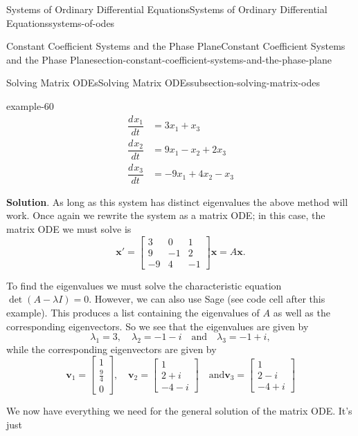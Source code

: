 \documentclass[oneside,10pt,]{book}
\numberwithin{equation}{section}
\renewcommand{\vec}[1]{\mathbf{#1}}
\newcommand{\dv}[3][]{\dfrac{d^{#1} #2}{d #3^{#1}}}
\newcommand{\amp}{&}
\begin{document}
\begin{chapterptx}{Systems of Ordinary Differential Equations}{}{Systems of Ordinary Differential Equations}{}{}{systems-of-odes}
\begin{sectionptx}{Constant Coefficient Systems and the Phase Plane}{}{Constant Coefficient Systems and the Phase Plane}{}{}{section-constant-coefficient-systems-and-the-phase-plane}
\begin{subsectionptx}{Solving Matrix ODEs}{}{Solving Matrix ODEs}{}{}{subsection-solving-matrix-odes}
\begin{example}{}{example-60}
\begin{align*}
\dv{x_{1}}{t} \amp = 3x_{1}+x_{3}\\
\dv{x_{2}}{t} \amp = 9x_{1}-x_{2}+2x_{3}\\
\dv{x_{3}}{t} \amp = -9x_{1} + 4x_{2} - x_{3}
\end{align*}
%
\par\smallskip%
\noindent\textbf{Solution}.\hypertarget{solution-57}{}\quad%
\hypertarget{p-356}{}%
As long as this system has distinct eigenvalues the above method will work. Once again we rewrite the system as a matrix ODE; in this case, the matrix ODE we must solve is%
\begin{equation*}
\vec{x}' = \begin{bmatrix}3 \amp  0 \amp  1 \\ 9 \amp  -1 \amp  2 \\ -9 \amp  4 \amp  -1\end{bmatrix}\vec{x} = A\vec{x}.
\end{equation*}
%
\par
\hypertarget{p-357}{}%
To find the eigenvalues we must solve the characteristic equation \(\det(A-\lambda I)=0\). However, we can also use Sage (see code cell after this example). This produces a list containing the eigenvalues of \(A\) as well as the corresponding eigenvectors. So we see that the eigenvalues are given by%
\begin{equation*}
\lambda_{1} = 3, \quad\lambda_{2} = -1 - i\quad\text{and}\quad\lambda_{3} = -1 + i,
\end{equation*}
while the corresponding eigenvectors are given by%
\begin{equation*}
\vec{v}_{1} = \begin{bmatrix}1 \\ \frac{9}{4} \\ 0\end{bmatrix}, \quad\vec{v}_{2} = \begin{bmatrix} 1 \\ 2 + i \\ -4 - i \end{bmatrix}\quad\text{and}\vec{v}_{3} = \begin{bmatrix} 1 \\ 2 - i \\ -4 + i \end{bmatrix}
\end{equation*}
%
\par
\hypertarget{p-358}{}%
We now have everything we need for the general solution of the matrix ODE. It's just%
\begin{equation*}

\end{equation*}
\end{example}
\end{subsectionptx}
\end{sectionptx}
\end{chapterptx}
\end{document}
